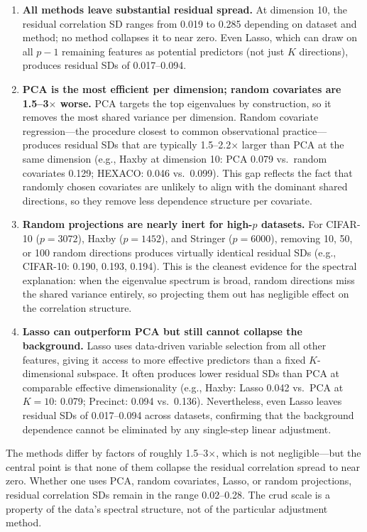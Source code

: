 \begin{enumerate}
\item \textbf{All methods leave substantial residual spread.}
  At dimension 10, the residual correlation SD ranges from 0.019 to 0.285
  depending on dataset and method; no method collapses it to near zero.
  Even Lasso, which can draw on all $p-1$ remaining features as potential
  predictors (not just $K$ directions), produces residual SDs of 0.017--0.094.

\item \textbf{PCA is the most efficient per dimension; random covariates are
  1.5--3$\times$ worse.}
  PCA targets the top eigenvalues by construction, so it removes the most
  shared variance per dimension. Random covariate regression---the procedure
  closest to common observational practice---produces residual SDs that are
  typically 1.5--2.2$\times$ larger than PCA at the same dimension
  (e.g., Haxby at dimension 10: PCA 0.079 vs.\ random covariates 0.129;
  HEXACO: 0.046 vs.\ 0.099).
  This gap reflects the fact that randomly chosen covariates are unlikely to
  align with the dominant shared directions, so they remove less dependence
  structure per covariate.

\item \textbf{Random projections are nearly inert for high-$p$ datasets.}
  For CIFAR-10 ($p{=}3072$), Haxby ($p{=}1452$), and Stringer ($p{=}6000$),
  removing 10, 50, or 100 random directions produces virtually identical
  residual SDs (e.g., CIFAR-10: 0.190, 0.193, 0.194).
  This is the cleanest evidence for the spectral explanation: when the
  eigenvalue spectrum is broad, random directions miss the shared variance
  entirely, so projecting them out has negligible effect on the correlation
  structure.

\item \textbf{Lasso can outperform PCA but still cannot collapse the background.}
  Lasso uses data-driven variable selection from all other features, giving it
  access to more effective predictors than a fixed $K$-dimensional subspace.
  It often produces lower residual SDs than PCA at comparable effective
  dimensionality (e.g., Haxby: Lasso 0.042 vs.\ PCA at $K{=}10$: 0.079;
  Precinct: 0.094 vs.\ 0.136). Nevertheless, even Lasso leaves residual SDs
  of 0.017--0.094 across datasets, confirming that the background dependence
  cannot be eliminated by any single-step linear adjustment.
\end{enumerate}

The methods differ by factors of roughly 1.5--3$\times$, which is not
negligible---but the central point is that none of them collapse the residual
correlation spread to near zero. Whether one uses PCA, random covariates, Lasso,
or random projections, residual correlation SDs remain in the range
0.02--0.28. The crud scale is a property of the data's spectral structure,
not of the particular adjustment method.

